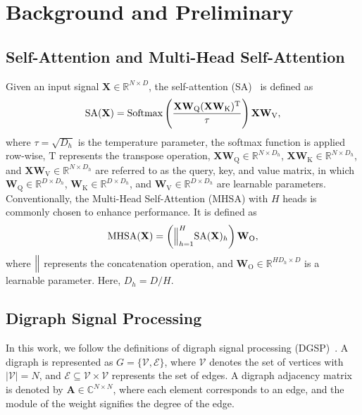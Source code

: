 \section{Background and Preliminary}
\subsection{Self-Attention and Multi-Head Self-Attention}
Given an input signal $\mathbf{X} \in \mathbb{R}^{N \times D}$, the self-attention (SA)~\citep{NIPS2017_3f5ee243} is defined as
\begin{equation}\label{eq:shsa}
\centering
\mathrm{SA}(\mathbf{X}) = 
\mathrm{Softmax}\left(\frac{\mathbf{X}\mathbf{W}_{\text{Q}}(\mathbf{X}\mathbf{W}_{\text{K}})^{\mathrm{T}}}{\tau}\right)\mathbf{X}\mathbf{W}_{\text{V}},
\end{equation}
where $\tau=\sqrt{D_{h}}$ is the temperature parameter, the softmax function is applied row-wise, $\mathrm{T}$ represents the transpose operation, $\mathbf{X}\mathbf{W}_{\text{Q}} \in \mathbb{R}^{N \times D_{h}}$, $\mathbf{X}\mathbf{W}_{\text{K}} \in \mathbb{R}^{N \times D_{h}}$, and $\mathbf{X}\mathbf{W}_{\text{V}} \in \mathbb{R}^{N \times D_{h}}$ are referred to as the query, key, and value matrix, in which $\mathbf{W}_{\text{Q}} \in \mathbb{R}^{D \times D_{h}}$, $\mathbf{W}_{\text{K}} \in \mathbb{R}^{D \times D_{h}}$, and $\mathbf{W}_{\text{V}} \in \mathbb{R}^{D \times D_{h}}$ are learnable parameters. Conventionally, the Multi-Head Self-Attention (MHSA) with $H$ heads is commonly chosen to enhance performance. It is defined as
\begin{equation}\label{eq:mha}
\centering
\mathrm{MHSA}(\mathbf{X}) = \left(\Big{\Vert}_{h=1}^{H}\mathrm{SA}(\mathbf{X})_{h}\right)\mathbf{W}_{\text{O}},
\end{equation}
where $\Big{\Vert}$ represents the concatenation operation, and $\mathbf{W}_{\text{O}} \in \mathbb{R}^{HD_{h} \times D}$ is a learnable parameter. Here, $D_{h} = D/H$.

\subsection{Digraph Signal Processing}
In this work, we follow the definitions of digraph signal processing (DGSP)~\citep{10388222,6409473,6638850,6808520}. A digraph is represented as $G = \{\mathcal{V},\mathcal{E}\}$, where $\mathcal{V}$ denotes the set of vertices with $|\mathcal{V}| = N$, and $\mathcal{E} \subseteq \mathcal{V}\times\mathcal{V}$ represents the set of edges. A digraph adjacency matrix is denoted by $\mathbf{A} \in \mathbb{C}^{N \times N}$, where each element corresponds to an edge, and the module of the weight signifies the degree of the edge.

